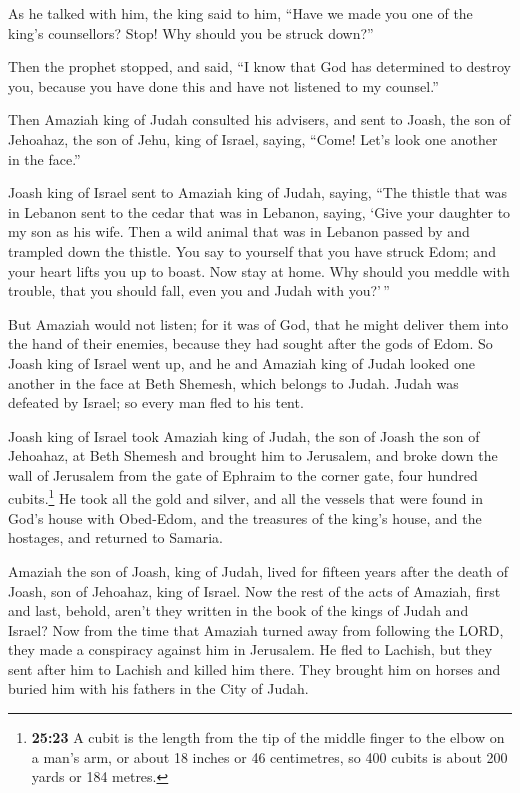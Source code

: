 As he talked with him, the king said to him, ``Have we
made you one of the king's counsellors? Stop! Why should you be struck
down?''

Then the prophet stopped, and said, ``I know that God has determined to
destroy you, because you have done this and have not listened to my
counsel.''

 Then Amaziah king of Judah consulted his advisers, and
sent to Joash, the son of Jehoahaz, the son of Jehu, king of Israel,
saying, ``Come! Let's look one another in the face.''

 Joash king of Israel sent to Amaziah king of Judah,
saying, ``The thistle that was in Lebanon sent to the cedar that was in
Lebanon, saying, `Give your daughter to my son as his wife. Then a wild
animal that was in Lebanon passed by and trampled down the thistle.
 You say to yourself that you have struck Edom; and your
heart lifts you up to boast. Now stay at home. Why should you meddle
with trouble, that you should fall, even you and Judah with you?'\,''

 But Amaziah would not listen; for it was of God, that he
might deliver them into the hand of their enemies, because they had
sought after the gods of Edom.  So Joash king of Israel
went up, and he and Amaziah king of Judah looked one another in the face
at Beth Shemesh, which belongs to Judah.  Judah was
defeated by Israel; so every man fled to his tent.

 Joash king of Israel took Amaziah king of Judah, the son
of Joash the son of Jehoahaz, at Beth Shemesh and brought him to
Jerusalem, and broke down the wall of Jerusalem from the gate of Ephraim
to the corner gate, four hundred cubits.\footnote{\textbf{25:23} A cubit
  is the length from the tip of the middle finger to the elbow on a
  man's arm, or about 18 inches or 46 centimetres, so 400 cubits is
  about 200 yards or 184 metres.}  He took all the gold
and silver, and all the vessels that were found in God's house with
Obed-Edom, and the treasures of the king's house, and the hostages, and
returned to Samaria.

 Amaziah the son of Joash, king of Judah, lived for
fifteen years after the death of Joash, son of Jehoahaz, king of Israel.
 Now the rest of the acts of Amaziah, first and last,
behold, aren't they written in the book of the kings of Judah and
Israel?  Now from the time that Amaziah turned away from
following the LORD, they made a conspiracy against him in Jerusalem. He
fled to Lachish, but they sent after him to Lachish and killed him
there.  They brought him on horses and buried him with
his fathers in the City of Judah.

